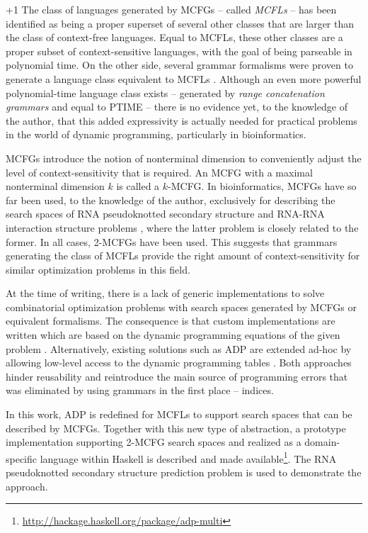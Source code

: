 \documentclass[
    a4paper,
    12pt,
    twoside,
    BCOR=12mm,
    parskip=half,
    chapterprefix,
    numbers=noenddot,
    bibliography=totoc
]{scrbook}
\begin{document}
\looseness+1 The class of languages generated by \glspl{MCFG} -- called \emph{\glspl{MCFL}} -- has been identified \citep{seki_multiple_1991,kato_generative_2005} as being a proper superset of several other classes that are larger than the class of context-free languages. Equal to \glspl{MCFL}, these other classes are a proper subset of context-sensitive languages, with the goal of being parseable in polynomial time. On the other side, several grammar formalisms were proven to generate a language class equivalent to \glspl{MCFL} \citep[cf.][]{kallmeyer_parsing_2010}. Although an even more powerful polynomial-time language class exists -- generated by \emph{range concatenation grammars} \citep{boullier_proposal_1998} and equal to PTIME -- there is no evidence yet, to the knowledge of the author, that this added expressivity is actually needed for practical problems in the world of dynamic programming, particularly in bioinformatics. 

\glspl{MCFG} introduce the notion of nonterminal dimension to conveniently adjust the level of context-sensitivity that is required. An \gls{MCFG} with a maximal nonterminal dimension $k$ is called a $k$-\gls{MCFG}. In bioinformatics, \glspl{MCFG} have so far been used, to the knowledge of the author, exclusively for describing the search spaces of RNA pseudoknotted secondary structure \citep[e.g.][]{kato_rna_2006,reidys_topology_2011} and RNA-RNA interaction structure problems \citep[e.g.][]{kato_grammatical_2009,andersen_topology_2012}, where the latter problem is closely related to the former. In all cases, 2-\glspl{MCFG} have been used. 
This suggests that grammars generating the class of \glspl{MCFL} provide the right amount of context-sensitivity for similar optimization problems in this field.

At the time of writing, there is a lack of generic implementations to solve combinatorial optimization problems with search spaces generated by \glspl{MCFG} or equivalent formalisms. The consequence is that custom implementations are written which are based on the dynamic programming equations of the given problem \citep[e.g.][]{reidys_topology_2011}. Alternatively, existing solutions such as ADP are extended ad-hoc by allowing low-level access to the dynamic programming tables \citep[e.g.][]{reeder_design_2004}. Both approaches hinder reusability and reintroduce the main source of programming errors that was eliminated by using grammars in the first place -- indices.

In this work, \gls{ADP} is redefined for \glspl{MCFL} to support search spaces that can be described by \glspl{MCFG}.
Together with this new type of abstraction, a prototype implementation supporting 2-MCFG search spaces and realized as a domain-specific language within Haskell is described and made available\footnote{\url{http://hackage.haskell.org/package/adp-multi}}. The RNA pseudoknotted secondary structure prediction problem is used to demonstrate the approach.
\end{document}
